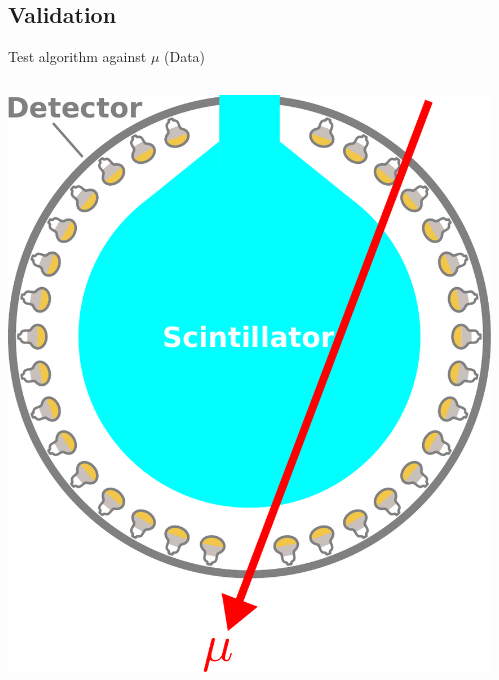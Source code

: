 \documentclass[14pt]{beamer}
\begin{document}
\subsection{Validation}
\begin{frame}{Test algorithm against $\mu$ (Data)}
	\begin{columns}[T]
		\begin{block}{}
			\vspace{5mm}
			\includegraphics[width=\linewidth]{through_going_muon-with_scintillator.pdf}
		\end{block}
		\begin{block}{\centering{{\fontsize{10pt}{10pt}\selectfont{Agreement
			with $\mu$-fitter\\which uses\\entry/exit points\\~}}}}

\end{block}
\end{columns}
\end{frame}
\end{document}
